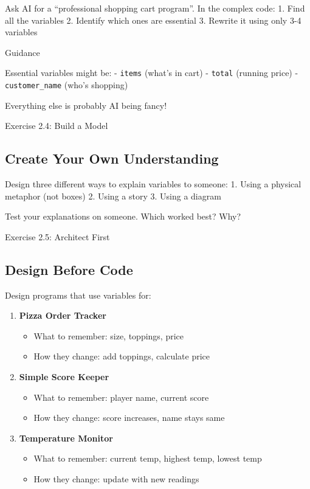 \documentclass[
  letterpaper,
  DIV=11,
  numbers=noendperiod,
  oneside]{scrreprt}
\providecommand{\tightlist}{%
  \setlength{\itemsep}{0pt}\setlength{\parskip}{0pt}}\usepackage{longtable,booktabs,array}
\begin{document}
Ask AI for a ``professional shopping cart program''. In the complex
code: 1. Find all the variables 2. Identify which ones are essential 3.
Rewrite it using only 3-4 variables

Guidance

Essential variables might be: - \texttt{items} (what's in cart) -
\texttt{total} (running price) - \texttt{customer\_name} (who's
shopping)

Everything else is probably AI being fancy!

Exercise 2.4: Build a Model

\subsection{Create Your Own
Understanding}\label{create-your-own-understanding}

Design three different ways to explain variables to someone: 1. Using a
physical metaphor (not boxes) 2. Using a story 3. Using a diagram

Test your explanations on someone. Which worked best? Why?

Exercise 2.5: Architect First

\subsection{Design Before Code}\label{design-before-code-1}

Design programs that use variables for:

\begin{enumerate}
\def\labelenumi{\arabic{enumi}.}
\tightlist
\item
  \textbf{Pizza Order Tracker}

  \begin{itemize}
  \tightlist
  \item
    What to remember: size, toppings, price
  \item
    How they change: add toppings, calculate price
  \end{itemize}
\item
  \textbf{Simple Score Keeper}

  \begin{itemize}
  \tightlist
  \item
    What to remember: player name, current score
  \item
    How they change: score increases, name stays same
  \end{itemize}
\item
  \textbf{Temperature Monitor}

  \begin{itemize}
  \tightlist
  \item
    What to remember: current temp, highest temp, lowest temp
  \item
    How they change: update with new readings
  \end{itemize}
\end{enumerate}
\end{document}
